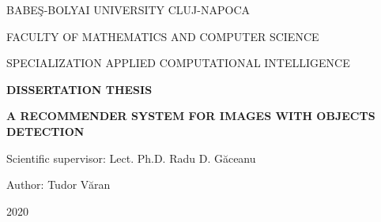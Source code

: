 \documentclass[a4paper, 12pt, english]{report}
\begin{document}
\begin{titlepage}
\sloppy
\begin{center}
\Large{BABE\c{S}-BOLYAI UNIVERSITY CLUJ-NAPOCA}

\Large{FACULTY OF MATHEMATICS AND COMPUTER SCIENCE}

\Large{SPECIALIZATION APPLIED COMPUTATIONAL INTELLIGENCE}

\vspace{6cm}
\Large \textbf{DISSERTATION THESIS}

\vspace{1.3cm}
\Huge \textbf{A RECOMMENDER SYSTEM FOR IMAGES WITH OBJECTS DETECTION}

\end{center}
\vspace{4cm}

\begin{flushleft}
	\Large{Scientific supervisor: Lect. Ph.D. Radu D. G\u{a}ceanu}
\end{flushleft}

\vspace{1cm}

\begin{flushright}
	\Large{Author: Tudor V\u{a}ran}
\end{flushright}

\vspace{1cm}

\begin{center}
\Large{2020}
\end{center}

\end{titlepage}
\end{document}
